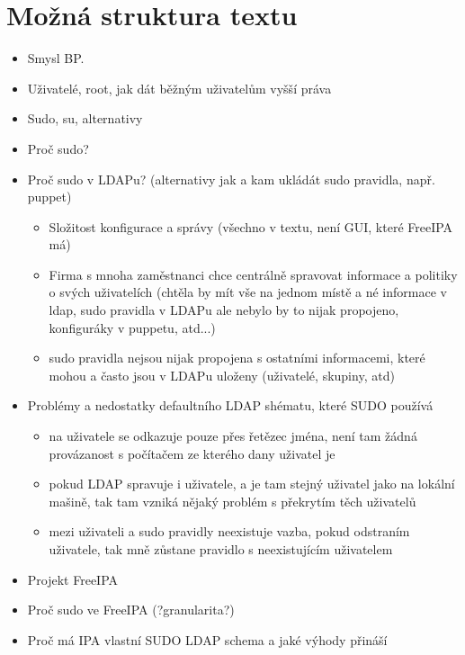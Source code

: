 \documentclass[12pt,a4paper,titlepage,final]{article}
\begin{document}
\section*{Možná struktura textu}
\begin{itemize}
        \item        Smysl BP.
        \item Uživatelé, root, jak dát běžným uživatelům vyšší práva
        \item Sudo, su, alternativy
        \item Proč sudo?
        \item        Proč sudo v LDAPu? (alternativy jak a kam ukládát sudo pravidla, např.
                puppet)

        \begin{itemize}
                \item Složitost konfigurace a správy (všechno v textu, není GUI, které FreeIPA má)
                \item Firma s mnoha zaměstnanci chce centrálně spravovat informace a
                        politiky o svých uživatelích (chtěla by mít vše na jednom místě a né
                        informace v ldap, sudo pravidla v LDAPu ale nebylo by to nijak propojeno,
                        konfiguráky v puppetu, atd...)
                \item sudo pravidla nejsou nijak propojena s ostatními informacemi, které
                        mohou a často jsou v LDAPu uloženy (uživatelé, skupiny, atd)
        \end{itemize}
        
        \item Problémy a nedostatky defaultního LDAP shématu, které SUDO používá
        \begin{itemize}
                \item na uživatele se odkazuje pouze přes řetězec jména, není tam žádná
                        provázanost s počítačem ze kterého dany uživatel je
                \item pokud LDAP spravuje i uživatele, a je tam stejný uživatel jako na
                        lokální mašině, tak tam vzniká nějaký problém s překrytím těch uživatelů
                \item mezi uživateli a sudo pravidly neexistuje vazba, pokud odstraním
                        uživatele, tak mně zůstane pravidlo s neexistujícím uživatelem
        \end{itemize}
        \item Projekt FreeIPA
        \item Proč sudo ve FreeIPA (?granularita?)
        \item Proč má IPA vlastní SUDO LDAP schema a jaké výhody přináší


\end{itemize}
\end{document}
